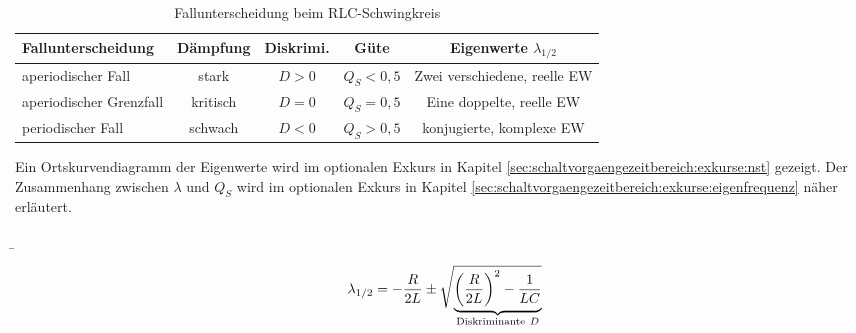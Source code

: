 \begin{frame}[t]
{\begin{table}[H]\centering
    \caption{Fallunterscheidung beim RLC-Schwingkreis}
    \label{tab:rlc:fallunterscheidung}
    \begin{tabular}{lcccc} \toprule
        \textbf{Fallunterscheidung}  & \textbf{Dämpfung} & \textbf{Diskrimi.} & \textbf{Güte} & \textbf{Eigenwerte} $\lambda_{1/2}$ \\ \midrule
        aperiodischer Fall           & stark             & $D > 0$            & $Q_S < 0,5$     & Zwei verschiedene, reelle EW  \\
        aperiodischer Grenzfall      & kritisch          & $D = 0$            & $Q_S = 0,5$     & Eine doppelte, reelle EW \\
        periodischer Fall            & schwach           & $D < 0$            & $Q_S > 0,5$     & konjugierte, komplexe EW \\ \bottomrule
    \end{tabular}
\end{table}

Ein Ortskurvendiagramm der Eigenwerte wird im optionalen Exkurs in Kapitel \ref{sec:schaltvorgaengezeitbereich:exkurse:nst} gezeigt.
Der Zusammenhang zwischen $\lambda$ und $Q_S$ wird im optionalen Exkurs in Kapitel \ref{sec:schaltvorgaengezeitbereich:exkurse:eigenfrequenz} näher erläutert.

}%
\b{%
\begin{minipage}{\textwidth}\centering
    \begin{minipage}[t][3cm][]{0.48\textwidth}\centering
    \end{minipage}%
    \begin{minipage}[t][3cm][]{0.48\textwidth}\centering
        \begin{align*}
            \lambda_{1/2} = -\frac{R}{2L} \pm \sqrt{
                \smash{\underbrace{%
                \left(\frac{R}{2L}\right)^2 - \frac{1}{LC}
                }_{\mathclap{\text{Diskriminante}\ D}}}
                \vphantom{\left(\frac{R}{2L}\right)^2 - \frac{1}{LC}}%
            }%
        \end{align*}
    \end{minipage}
\end{minipage}\vspace{2pt}

}
\end{frame}
